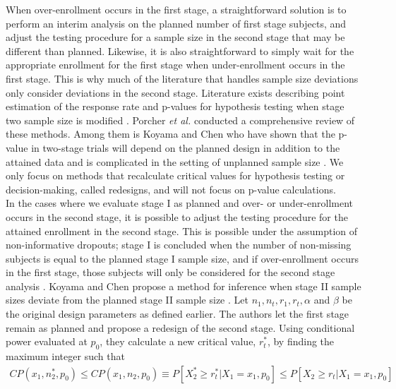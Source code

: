 \documentclass[12pt]{report}\usepackage[]{graphicx}\usepackage[]{color}
\newlength{\li}\setlength{\li}{14.48pt}
\newlength{\di}\setlength{\di}{-3.5mm}
\begin{document}
When over-enrollment occurs in the first stage, a straightforward solution is to perform an interim analysis on the planned number of first stage subjects, and adjust the testing procedure for a sample size in the second stage that may be different than planned. Likewise, it is also straightforward to simply wait for the appropriate enrollment for the first stage when under-enrollment occurs in the first stage. This is why much of the literature that handles sample size deviations only consider deviations in the second stage. Literature exists describing point estimation of the response rate and p-values for hypothesis testing when stage two sample size is modified \cite{Koyama}\cite{Whitehead}\cite{Changpoint}\cite{Guo}\cite{Jungest}\cite{Tsai}\cite{Jungpvalue}. Porcher \textit{et al.} \cite{Porcher} conducted a comprehensive review of these methods. Among them is Koyama and Chen who have shown that the p-value in two-stage trials will depend on the planned design in addition to the attained data and is complicated in the setting of unplanned sample size \cite{Koyama}. We only focus on methods that recalculate critical values for hypothesis testing or decision-making, called redesigns, and will not focus on p-value calculations. \\
\indent In the cases where we evaluate stage I as planned and over- or under-enrollment occurs in the second stage, it is possible to adjust the testing procedure for the attained enrollment in the second stage.  This is possible under the assumption of non-informative dropouts; stage I is concluded when the number of non-missing subjects is equal to the planned stage I sample size, and if over-enrollment occurs in the first stage, those subjects will only be considered for the second stage analysis \cite{Koyama}. Koyama and Chen propose a method for inference when stage II sample sizes deviate from the planned stage II sample size \cite{Koyama}. Let $n_1, n_t, r_1, r_t, \alpha$ and $\beta$ be the original design parameters as defined earlier. The authors let the first stage remain as planned and propose a redesign of the second stage. Using conditional power evaluated at $p_0$, they calculate a new critical value, $r_t^\ast$, by finding the maximum integer such that 
\begin{equation}
\begin{aligned}
CP(x_1, n_2^\ast, p_0) \leq CP(x_1, n_2, p_0) \equiv P[X_2^\ast \geq r_t^\ast | X_1 = x_1, p_0] \leq P[X_2 \geq r_t | X_1 = x_1, p_0]
\end{aligned}
\end{equation}
\end{document}

